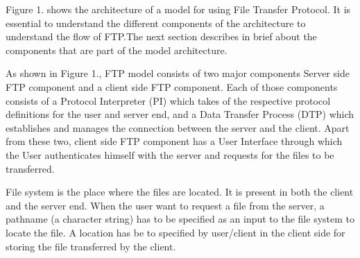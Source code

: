 \documentclass[9pt,twocolumn,twoside]{styles/osajnl}
\begin{document}
Figure 1. shows the architecture of a model for using File Transfer Protocol. It is essential to understand the different components of the architecture to understand the flow of FTP.The next section describes in brief about the components that are part of the model architecture.


As shown in Figure 1., FTP model consists of two major components Server side FTP component and a client side FTP component. Each of those components consists of a Protocol Interpreter (PI) which takes of the respective protocol definitions for the user and server end, and a Data Transfer Process (DTP) which establishes and manages the connection between the server and the client. Apart from these two, client side FTP component has a User Interface through which the User authenticates himself with the server and requests for the files to be transferred.

File system is the place where the files are located. It is present in both the client and the server end. When the user want to request a file from the server, a pathname (a character string) has to be specified as an input to the file system to locate the file. A location has be to specified by user/client in the client side for storing the file transferred by the client. 
\end{document}
